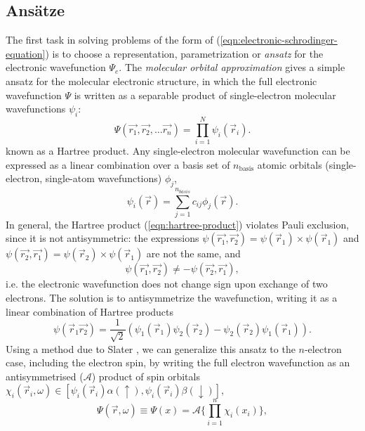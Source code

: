 \subsection{Ans\"atze}
The first task in solving problems of the form of (\ref{eqn:electronic-schrodinger-equation}) is to choose a representation, parametrization or \emph{ansatz} for the electronic wavefunction $\Psi_e$. 
The \emph{molecular orbital approximation} gives a simple ansatz for the molecular electronic structure, in which the full electronic wavefunction $\Psi$ is written as a separable product of single-electron molecular wavefunctions $\psi_i$: 
\begin{equation}
    \Psi(\vec{r_1}, \vec{r_2}, \ldots \vec{r_n}) = \prod_{i=1}^N\psi_i(\vec{r}_i).
    \label{eqn:hartree-product}
\end{equation}
known as a Hartree product. Any single-electron molecular wavefunction can  be expressed as a linear combination over a basis set of $n_{\mathrm{basis}}$ atomic orbitals (single-electron, single-atom wavefunctions) $\phi_j$,
\begin{equation}
    \psi_i(\vec{r}) = \sum_{j=1}^{n_{basis}} c_{ij} \phi_j (\vec{r}).
    \label{eqn:atomic-orbitals}
\end{equation}
In general, the Hartree product (\ref{eqn:hartree-product}) violates Pauli exclusion, since it is not antisymmetric: the expressions $\psi(\vec{r_1}, \vec{r_2}) = \psi(\vec{r}_1) \times \psi(\vec{r}_1)$ and $\psi(\vec{r_2}, \vec{r_1}) = \psi(\vec{r}_2) \times \psi(\vec{r}_1)$ are not the same, and 
\begin{equation}
   \psi(\vec{r_1}, \vec{r_2}) \ne -\psi(\vec{r_2}, \vec{r_1}),
\end{equation} 
i.e. the electronic wavefunction does not change sign upon exchange of two electrons.
The solution is to antisymmetrize the wavefunction, writing it as a linear combination of Hartree products 
\begin{equation}
    \psi(\vec{r}_1 \vec{r_2}) = \frac{1}{\sqrt{2}} \left(\psi_1(\vec{r}_1)\psi_2(\vec{r}_2) - \psi_2(\vec{r}_2)\psi_1(\vec{r}_1)\right).
\end{equation}
Using a method due to Slater \cite{Slater1929}, we can generalize this ansatz to the $n$-electron case, including the electron spin, by writing the full electron wavefunction as an antisymmetrised ($\mathcal{A}$) product of spin orbitals $\chi_i(\vec{r}_i, \omega) \in \left[ \psi_i(\vec{r}_i)\alpha(\uparrow), \psi_i(\vec{r}_i)\beta(\downarrow)  \right]$, 
\begin{equation}
    \Psi(\vec{r}, \omega) \equiv \Psi(x) = \mathcal{A} \{ \prod_{i=1}^n \chi_i(x_i) \}, 
\end{equation}
